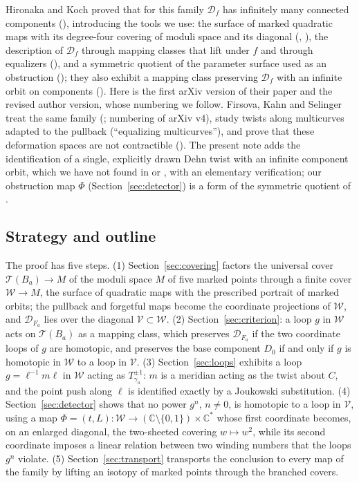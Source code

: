 \documentclass[12pt]{article}
\newcommand{\C}{\mathbb C}
\newcommand{\Teich}{\mathcal T}
\newcommand{\D}{\mathcal D}
\newcommand{\W}{\mathcal W}
\newcommand{\V}{\mathcal V}
\theoremstyle{remark}
\numberwithin{equation}{section}
\begin{document}
Hironaka and Koch \cite{HK} proved that for this family $\D_f$ has
infinitely many connected components (\cite[Thm.\ 1.4]{HK}), introducing
the tools we use: the surface of marked quadratic maps with its
degree-four covering of moduli space and its diagonal
(\cite[\S\S4.1--4.2]{HKa}, \cite[\S3]{HK}), the description of $\D_f$
through mapping classes that lift under $f$ and through equalizers
(\cite[\S\S2.8--2.11]{HK}), and a symmetric quotient of the parameter
surface used as an obstruction (\cite[\S2.12]{HK}); they also exhibit a
mapping class preserving $\D_f$ with an infinite orbit on components
(\cite[Prop.\ 3.2]{HK}). Here \cite{HKa} is the first arXiv version of
their paper and \cite{HK} the revised author version, whose numbering we
follow. Firsova, Kahn and Selinger \cite{FKS} treat the same family
(\cite[\S6]{FKS}; numbering of arXiv v4), study twists along multicurves
adapted to the pullback (``equalizing multicurves''), and prove that these
deformation spaces are not contractible (\cite[Lemma 8.4]{FKS}). The
present note adds the identification of a single, explicitly drawn Dehn
twist with an infinite component orbit, which we have not found in
\cite{HK} or \cite{FKS}, with an elementary verification; our obstruction
map $\Phi$ (Section~\ref{sec:detector}) is a form of the symmetric
quotient of \cite{HK}.

\subsection{Strategy and outline}\label{sec:strategy}

The proof has five steps. (1) Section~\ref{sec:covering} factors the
universal cover $\Teich(B_a)\to M$ of the moduli space $M$ of five marked
points through a finite cover $\W\to M$, the surface of quadratic maps with
the prescribed portrait of marked orbits; the pullback and forgetful maps
become the coordinate projections of $\W$, and $\D_{F_a}$ lies over the
diagonal $\V\subset\W$. (2) Section~\ref{sec:criterion}: a loop $g$ in
$\W$ acts on $\Teich(B_a)$ as a mapping class, which preserves $\D_{F_a}$
if the two coordinate loops of $g$ are homotopic, and preserves the base
component $D_0$ if and only if $g$ is homotopic in $\W$ to a loop in $\V$.
(3) Section~\ref{sec:loops} exhibits a loop $g=\ell^{-1}m\ell$ in $\W$
acting as $T_{\gamma_a}^{\pm1}$: $m$ is a meridian acting as the twist
about $C$, and the point push along $\ell$ is identified exactly by a
Joukowski substitution. (4) Section~\ref{sec:detector} shows that no power
$g^n$, $n\ne0$, is homotopic to a loop in $\V$, using a map
$\Phi=(t,L)\colon\W\to(\C\setminus\{0,1\})\times\C^*$ whose first
coordinate becomes, on an enlarged diagonal, the two-sheeted covering
$w\mapsto w^2$, while its second coordinate imposes a linear relation
between two winding numbers that the loops $g^n$ violate. (5)
Section~\ref{sec:transport} transports the conclusion to every map of the
family by lifting an isotopy of marked points through the branched covers.
\end{document}
